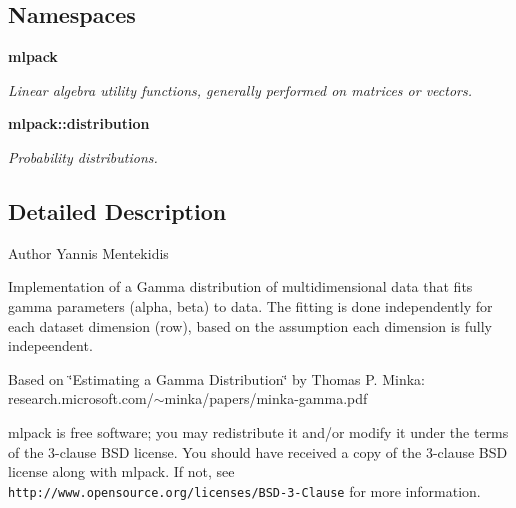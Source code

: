 \subsection*{Namespaces}
\begin{DoxyCompactItemize}
\item 
 {\bf mlpack}
\begin{DoxyCompactList}\small\item\em Linear algebra utility functions, generally performed on matrices or vectors. \end{DoxyCompactList}\item 
 {\bf mlpack\+::distribution}
\begin{DoxyCompactList}\small\item\em Probability distributions. \end{DoxyCompactList}\end{DoxyCompactItemize}


\subsection{Detailed Description}
\begin{DoxyAuthor}{Author}
Yannis Mentekidis
\end{DoxyAuthor}
Implementation of a Gamma distribution of multidimensional data that fits gamma parameters (alpha, beta) to data. The fitting is done independently for each dataset dimension (row), based on the assumption each dimension is fully indepeendent.

Based on \char`\"{}\+Estimating a Gamma Distribution\char`\"{} by Thomas P. Minka\+: research.\+microsoft.\+com/$\sim$minka/papers/minka-\/gamma.pdf

mlpack is free software; you may redistribute it and/or modify it under the terms of the 3-\/clause B\+SD license. You should have received a copy of the 3-\/clause B\+SD license along with mlpack. If not, see {\tt http\+://www.\+opensource.\+org/licenses/\+B\+S\+D-\/3-\/\+Clause} for more information. 